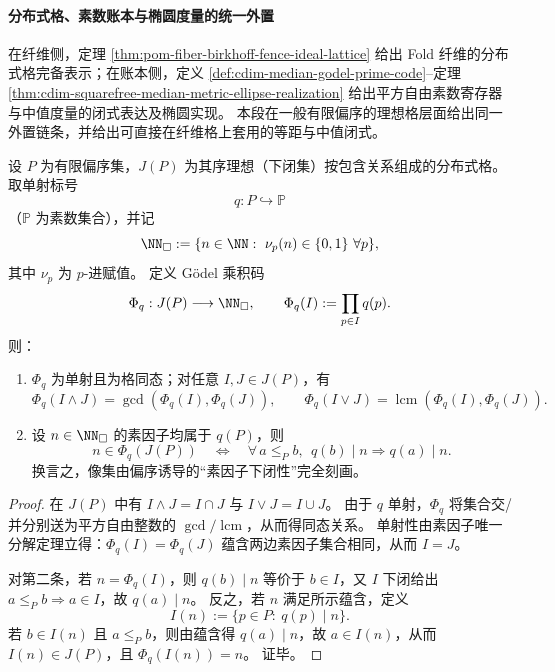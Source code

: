 \paragraph{分布式格、素数账本与椭圆度量的统一外置}
在纤维侧，定理 \ref{thm:pom-fiber-birkhoff-fence-ideal-lattice} 给出 Fold 纤维的分布式格完备表示；在账本侧，定义 \ref{def:cdim-median-godel-prime-code}--定理 \ref{thm:cdim-squarefree-median-metric-ellipse-realization} 给出平方自由素数寄存器与中值度量的闭式表达及椭圆实现。
本段在一般有限偏序的理想格层面给出同一外置链条，并给出可直接在纤维格上套用的等距与中值闭式。

\begin{theorem}\label{thm:xi-godel-birkhoff-ideal-lattice-squarefree}
设 \(P\) 为有限偏序集，\(J(P)\) 为其序理想（下闭集）按包含关系组成的分布式格。
取单射标号
\[
q:P\hookrightarrow \mathbb P
\]
（\(\mathbb P\) 为素数集合），并记
\[
\NN_{\square}:=\{n\in\NN:\ \nu_p(n)\in\{0,1\}\ \forall p\},
\]
其中 \(\nu_p\) 为 \(p\)-进赋值。
定义 Gödel 乘积码
\[
\Phi_q:J(P)\longrightarrow \NN_{\square},\qquad
\Phi_q(I):=\prod_{p\in I}q(p).
\]
则：
\begin{enumerate}
  \item \(\Phi_q\) 为单射且为格同态；对任意 \(I,J\in J(P)\)，有
  \[
  \Phi_q(I\wedge J)=\gcd(\Phi_q(I),\Phi_q(J)),\qquad
  \Phi_q(I\vee J)=\operatorname{lcm}(\Phi_q(I),\Phi_q(J)).
  \]
  \item 设 \(n\in\NN_{\square}\) 的素因子均属于 \(q(P)\)，则
  \[
  n\in\Phi_q(J(P))
  \quad\Longleftrightarrow\quad
  \forall\, a\le_P b,\ \ q(b)\mid n\Rightarrow q(a)\mid n.
  \]
  换言之，像集由偏序诱导的“素因子下闭性”完全刻画。
\end{enumerate}
\end{theorem}
\begin{proof}
在 \(J(P)\) 中有 \(I\wedge J=I\cap J\) 与 \(I\vee J=I\cup J\)。
由于 \(q\) 单射，\(\Phi_q\) 将集合交/并分别送为平方自由整数的 \(\gcd/\operatorname{lcm}\)，从而得同态关系。
单射性由素因子唯一分解定理立得：\(\Phi_q(I)=\Phi_q(J)\) 蕴含两边素因子集合相同，从而 \(I=J\)。

对第二条，若 \(n=\Phi_q(I)\)，则 \(q(b)\mid n\) 等价于 \(b\in I\)，又 \(I\) 下闭给出 \(a\le_P b\Rightarrow a\in I\)，故 \(q(a)\mid n\)。
反之，若 \(n\) 满足所示蕴含，定义
\[
I(n):=\{p\in P:\ q(p)\mid n\}.
\]
若 \(b\in I(n)\) 且 \(a\le_P b\)，则由蕴含得 \(q(a)\mid n\)，故 \(a\in I(n)\)，从而 \(I(n)\in J(P)\)，且 \(\Phi_q(I(n))=n\)。
证毕。
\end{proof}

